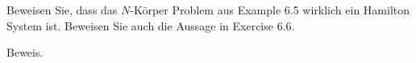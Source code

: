 \begin{exercise}
  Beweisen Sie, dass das $N$-Körper Problem aus Example 6.5
  wirklich ein Hamilton System ist. Beweisen Sie auch die
  Aussage in Exercise 6.6.
\end{exercise}

\begin{solution}
  Beweis.
\end{solution}
